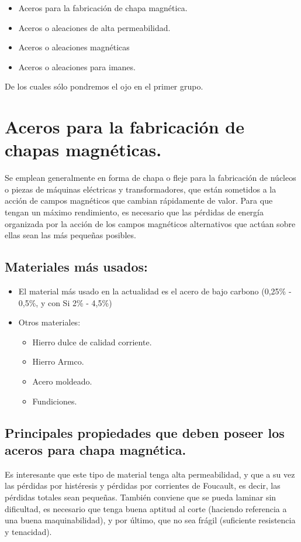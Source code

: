 \documentclass[12pt,a4paper]{article}
\begin{document}
\begin{itemize}
    \item Aceros para la fabricación de chapa magnética.
    \item Aceros o aleaciones de alta permeabilidad.
    \item Aceros o aleaciones magnéticas
    \item Aceros o aleaciones para imanes.
\end{itemize}

De los cuales sólo pondremos el ojo en el primer grupo.

\section{Aceros para la fabricación de chapas magnéticas.}

Se emplean generalmente en forma de chapa o fleje para la fabricación de núcleos o piezas de máquinas eléctricas y transformadores, que están sometidos a la acción de campos magnéticos que cambian rápidamente de valor. Para que tengan un máximo rendimiento, es necesario que las pérdidas de energía organizada por la acción de los campos magnéticos alternativos que actúan sobre ellas sean las más pequeñas posibles.

\subsection{Materiales más usados:}
\begin{itemize}
    \item El material más usado en la actualidad es el acero de bajo carbono (0,25\% - 0,5\%, y con Si 2\% - 4,5\%)
    \item Otros materiales: 
    \begin{itemize}
        \item Hierro dulce de calidad corriente.
        \item Hierro Armco.
        \item Acero moldeado.
        \item Fundiciones.
    \end{itemize}
\end{itemize}

\subsection{Principales propiedades que deben poseer los aceros para chapa magnética.}

Es interesante que este tipo de material tenga alta permeabilidad, y que a su vez las pérdidas por histéresis y pérdidas por corrientes de Foucault, es decir, las pérdidas totales sean pequeñas. También conviene que se pueda laminar sin dificultad, es necesario que tenga buena aptitud al corte (haciendo referencia a una buena maquinabilidad), y por último, que no sea frágil (suficiente resistencia y tenacidad).
\end{document}
